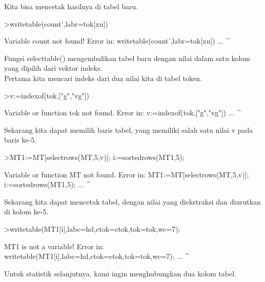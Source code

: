 \documentclass[a4paper,10pt]{article}
\begin{document}
\begin{eulernotebook}
\begin{eulercomment}
\begin{eulercomment}
\begin{eulercomment}
\begin{eulercomment}
\begin{eulercomment}
\begin{eulercomment}
\begin{eulercomment}
\begin{eulercomment}
\begin{eulercomment}
\begin{eulercomment}
\begin{eulercomment}
\begin{eulercomment}
\begin{eulercomment}
\begin{eulercomment}
\begin{eulercomment}
\begin{eulercomment}
\begin{eulercomment}
\begin{eulercomment}
\begin{eulercomment}
Kita bisa mencetak hasilnya di tabel baru.
\end{eulercomment}
\begin{eulerprompt}
>writetable(count',labr=tok[xu])
\end{eulerprompt}
\begin{euleroutput}
  Variable count not found!
  Error in:
  writetable(count',labr=tok[xu]) ...
                   ^
\end{euleroutput}
\begin{eulercomment}
Fungsi selecttable() mengembalikan tabel baru dengan nilai dalam satu
kolom yang dipilih dari vektor indeks.\\
Pertama kita mencari indeks dari dua nilai kita di tabel token.
\end{eulercomment}
\begin{eulerprompt}
>v:=indexof(tok,["g","vg"])
\end{eulerprompt}
\begin{euleroutput}
  Variable or function tok not found.
  Error in:
  v:=indexof(tok,["g","vg"]) ...
                ^
\end{euleroutput}
\begin{eulercomment}
Sekarang kita dapat memilih baris tabel, yang memiliki salah satu
nilai v pada baris ke-5.
\end{eulercomment}
\begin{eulerprompt}
>MT1:=MT[selectrows(MT,5,v)]; i:=sortedrows(MT1,5);
\end{eulerprompt}
\begin{euleroutput}
  Variable or function MT not found.
  Error in:
  MT1:=MT[selectrows(MT,5,v)]; i:=sortedrows(MT1,5); ...
                       ^
\end{euleroutput}
\begin{eulercomment}
Sekarang kita dapat mencetak tabel, dengan nilai yang diekstraksi dan
diurutkan di kolom ke-5.
\end{eulercomment}
\begin{eulerprompt}
>writetable(MT1[i],labc=hd,ctok=ctok,tok=tok,wc=7);
\end{eulerprompt}
\begin{euleroutput}
  MT1 is not a variable!
  Error in:
  writetable(MT1[i],labc=hd,ctok=ctok,tok=tok,wc=7); ...
                   ^
\end{euleroutput}
\begin{eulercomment}
Untuk statistik selanjutnya, kami ingin menghubungkan dua kolom tabel.

\end{eulercomment}
\end{eulercomment}
\end{eulercomment}
\end{eulercomment}
\end{eulercomment}
\end{eulercomment}
\end{eulercomment}
\end{eulercomment}
\end{eulercomment}
\end{eulercomment}
\end{eulercomment}
\end{eulercomment}
\end{eulercomment}
\end{eulercomment}
\end{eulercomment}
\end{eulercomment}
\end{eulercomment}
\end{eulercomment}
\end{eulercomment}
\end{eulernotebook}
\end{document}
